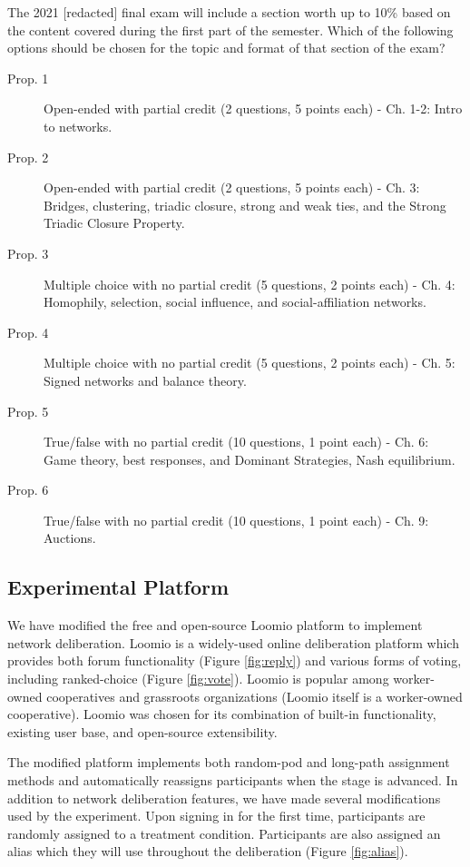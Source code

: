 \begin{displayquote}

The 2021 [redacted] final exam will include a section worth up to 10\% based on the content covered during the first part of the semester. Which of the following options should be chosen for the topic and format of that section of the exam?

\begin{description}
\item[Prop. 1]{Open-ended with partial credit (2 questions, 5 points each) - Ch. 1-2: Intro to networks.}
\item[Prop. 2]{Open-ended with partial credit (2 questions, 5 points each) - Ch. 3: Bridges, clustering, triadic closure, strong and weak ties, and the Strong Triadic Closure Property.}
\item[Prop. 3]{Multiple choice with no partial credit (5 questions, 2 points each) - Ch. 4: Homophily, selection, social influence, and social-affiliation networks.}
\item[Prop. 4]{Multiple choice with no partial credit (5 questions, 2 points each) - Ch. 5: Signed networks and balance theory.}
\item[Prop. 5]{True/false with no partial credit (10 questions, 1 point each) - Ch. 6: Game theory, best responses, and Dominant Strategies, Nash equilibrium.}
\item[Prop. 6]{True/false with no partial credit (10 questions, 1 point each) - Ch. 9:  Auctions.}
\end{description}
\end{displayquote}


\subsection{Experimental Platform}
\label{sec:exp-platform}

We have modified the free and open-source Loomio platform \cite{jackson_open_2016} to implement network deliberation.
Loomio is a widely-used online deliberation platform which provides both forum functionality (Figure \ref{fig:reply}) and various forms of voting, including ranked-choice (Figure \ref{fig:vote}).
Loomio is popular among worker-owned cooperatives and grassroots organizations (Loomio itself is a worker-owned cooperative).
Loomio was chosen for its combination of built-in functionality, existing user base, and open-source extensibility.

The modified platform implements both random-pod and long-path assignment methods and automatically reassigns participants when the stage is advanced.
In addition to network deliberation features, we have made several modifications used by the experiment.
Upon signing in for the first time, participants are randomly assigned to a treatment condition.
Participants are also assigned an alias which they will use throughout the deliberation (Figure \ref{fig:alias}).

